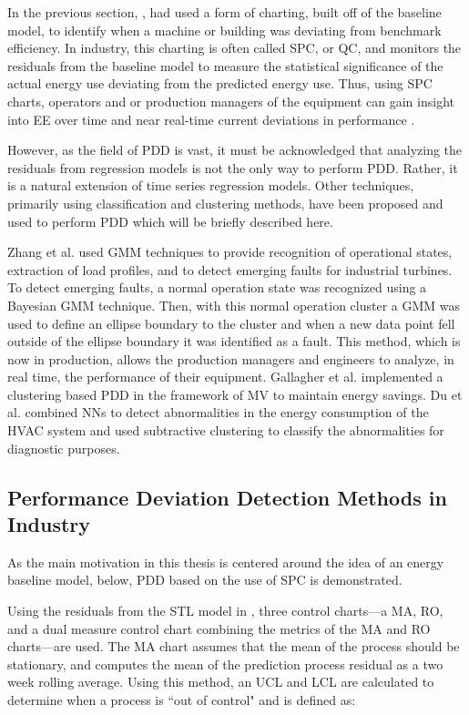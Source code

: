 In the previous section, \cite{tightening}\cite{cas}\cite{boiler}, had used a form of charting, built off of the baseline model, to identify when a machine or building was deviating from benchmark efficiency. In industry, this charting is often called SPC, or \ac{QC}, and monitors the residuals from the baseline model to measure the statistical significance of the actual energy use deviating from the predicted energy use. Thus, using SPC charts, operators and or production managers of the equipment can gain insight into EE over time and near real-time current deviations in performance \cite{oakland_statistical_2008}.

However, as the field of PDD is vast, it must be acknowledged that analyzing the residuals from regression models is not the only way to perform PDD. Rather, it is a natural extension of time series regression models. Other techniques, primarily using classification and clustering methods, have been proposed and used to perform PDD which will be briefly described here.

Zhang et al. \cite{gas-turbine-faults} used GMM techniques to provide recognition of operational states, extraction of load profiles, and to detect emerging faults for industrial turbines. To detect emerging faults, a normal operation state was recognized using a Bayesian GMM technique. Then, with this normal operation cluster a GMM was used to define an ellipse boundary to the cluster and when a new data point fell outside of the ellipse boundary it was identified as a fault. This method, which is now in production, allows the production managers and engineers to analyze, in real time, the performance of their equipment. Gallagher et al. \cite{intelliMAV} implemented a clustering based PDD in the framework of \ac{MV} to maintain energy savings. Du et al. \cite{fault-HVAC} combined NNs to detect abnormalities in the energy consumption of the HVAC system and used subtractive clustering to classify the abnormalities for diagnostic purposes.

\subsection{Performance Deviation Detection Methods in Industry}

As the main motivation in this thesis is centered around the idea of an energy baseline model, below, PDD based on the use of SPC is demonstrated.

Using the residuals from the STL model in \cite{tightening}, three control charts—a \ac{MA}, \ac{RO}, and a dual measure control chart combining the metrics of the MA and RO charts—are used. The MA chart assumes that the mean of the process should be stationary, and computes the mean of the prediction process residual as a two week rolling average. Using this method, an \ac{UCL} and \ac{LCL} are calculated to determine when a process is ``out of control" and is defined as:

